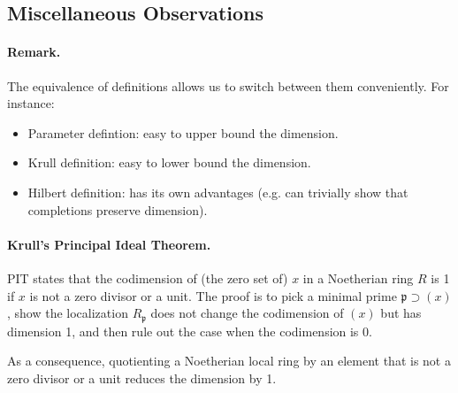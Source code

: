 \subsection{Miscellaneous Observations}
\paragraph{Remark.} The equivalence of definitions allows us to switch between them conveniently. For instance:
\begin{itemize}
    \item Parameter defintion: easy to upper bound the dimension.
    \item Krull definition: easy to lower bound the dimension.
    \item Hilbert definition: has its own advantages (e.g. can trivially show that completions preserve dimension).
\end{itemize}

\paragraph{Krull's Principal Ideal Theorem.} PIT states that the codimension of (the zero set of) $x$ in a Noetherian ring $R$ is 1 if $x$ is not a zero divisor or a unit. The proof is to pick a minimal prime $\mathfrak p \supset (x)$, show the localization $R_{\mathfrak p}$ does not change the codimension of $(x)$ but has dimension 1, and then rule out the case when the codimension is 0.

As a consequence, quotienting a Noetherian local ring by an element that is not a zero divisor or a unit reduces the dimension by 1.

